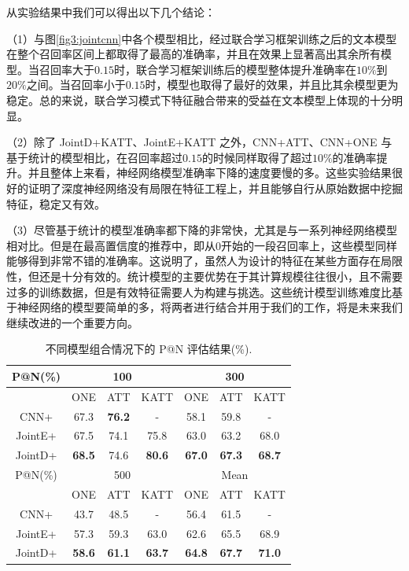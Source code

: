 从实验结果中我们可以得出以下几个结论：

（1）与图\ref{fig3:jointcnn}中各个模型相比，经过联合学习框架训练之后的文本模型在整个召回率区间上都取得了最高的准确率，并且在效果上显著高出其余所有模型。当召回率大于$0.15$时，联合学习框架训练后的模型整体提升准确率在$10\%$到$20\%$之间。当召回率小于$0.15$时，模型也取得了最好的效果，并且比其余模型更为稳定。总的来说，联合学习模式下特征融合带来的受益在文本模型上体现的十分明显。

（2）除了 JointD+KATT、JointE+KATT 之外，CNN+ATT、CNN+ONE 与基于统计的模型相比，在召回率超过$0.15$的时候同样取得了超过$10\%$的准确率提升。并且整体上来看，神经网络模型准确率下降的速度要慢的多。这些实验结果很好的证明了深度神经网络没有局限在特征工程上，并且能够自行从原始数据中挖掘特征，稳定又有效。

（3）尽管基于统计的模型准确率都下降的非常快，尤其是与一系列神经网络模型相对比。但是在最高置信度的推荐中，即从$0$开始的一段召回率上，这些模型同样能够得到非常不错的准确率。这说明了，虽然人为设计的特征在某些方面存在局限性，但还是十分有效的。统计模型的主要优势在于其计算规模往往很小，且不需要过多的训练数据，但是有效特征需要人为构建与挑选。这些统计模型训练难度比基于神经网络的模型要简单的多，将两者进行结合并用于我们的工作，将是未来我们继续改进的一个重要方向。

\vspace{25pt}
\begin{table}[h]
\setlength{\abovecaptionskip}{30pt} 
\centering
\caption{不同模型组合情况下的 P@N 评估结果(\%).}
\begin{tabular}{ccccccc} 
\toprule[1.5pt]
P@N(\%) & \multicolumn{3}{c}{100}                                      & \multicolumn{3}{c}{300} \\ 
\midrule[1pt]
& \multicolumn{1}{c}{ONE} & \multicolumn{1}{c}{ATT} & KATT & \multicolumn{1}{c}{ONE} & \multicolumn{1}{c}{ATT} & KATT \\
\midrule[1pt]
CNN+	& 67.3	& \textbf{76.2}	& -     & 58.1	& 59.8 	& -    \\ 
JointE+  & 67.5 	& 74.1	& 75.8  & 63.0 	& 63.2 	& 68.0  \\ 
JointD+  & \textbf{68.5}    & 74.6  & \textbf{80.6}  & \textbf{67.0} & \textbf{67.3} & \textbf{68.7}  \\ 
\midrule[1pt]
P@N(\%) & \multicolumn{3}{c}{500}                                      & \multicolumn{3}{c}{Mean} \\ 
\midrule[1pt]
& \multicolumn{1}{c}{ONE} & \multicolumn{1}{c}{ATT} & KATT & \multicolumn{1}{c}{ONE} & \multicolumn{1}{c}{ATT} & KATT \\ 
\midrule[1pt]
CNN+	& 43.7	& 48.5			& -     & 56.4 	& 61.5 	& -     \\ 
JointE+  & 57.3 	& 59.3 	& 63.0  & 62.6 	& 65.5  & 68.9  \\ 
JointD+  & \textbf{58.6}    & \textbf{61.1}  & \textbf{63.7}  & \textbf{64.8}   & \textbf{67.7}    & \textbf{71.0}  \\ 
\bottomrule[1.5pt]
\end{tabular}
\label{tab3:relationExt}
\end{table}


